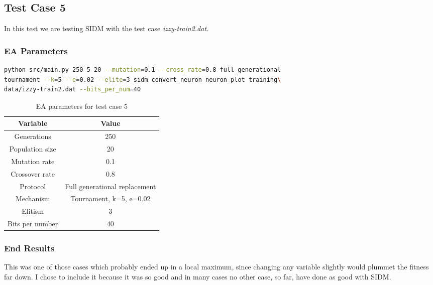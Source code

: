 \subsection{Test Case 5}\label{sec:test-case-5}
In this test we are testing SIDM with the test case
\textit{izzy-train2.dat}.
\subsubsection{EA Parameters}\label{sec:test-case-5-parameters}
\begin{lstlisting}[frame=single, language=bash, caption=Command-line to
replicate the results]
python src/main.py 250 5 20 --mutation=0.1 --cross_rate=0.8 full_generational
tournament --k=5 --e=0.02 --elite=3 sidm convert_neuron neuron_plot training\
data/izzy-train2.dat --bits_per_num=40
\end{lstlisting}
\begin{table}
	\begin{tabular}{c c}
		Variable & Value \\
		\hline
		Generations & 250 \\
		\hline
		Population size & 20 \\
		\hline
		Mutation rate & 0.1 \\
		\hline
		Crossover rate & 0.8 \\
		\hline
		Protocol & Full generational replacement \\
		\hline
		Mechanism & Tournament, k=5, e=0.02 \\
		\hline
		Elitism & 3 \\
		\hline
		Bits per number & 40\\
	\end{tabular}
	\caption{EA parameters for test case 5}
\end{table}
\subsubsection{End Results}\label{sec:test-case-5-results}
This was one of those cases which probably ended up in a local maximum, since
changing any variable slightly would plummet the fitness far down. I chose to
include it because it was so good and in many cases no other case, so far, have
done as good with SIDM.

